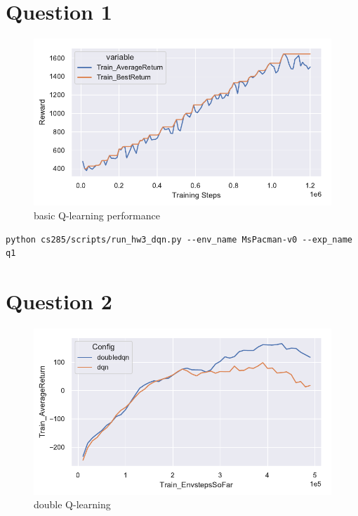 \documentclass[letterpaper, 10pt]{article}
\begin{document}
\section{Question 1}
\begin{figure}[h]
\centering
\includegraphics{figures/q1.pdf}
\caption{basic Q-learning performance}
\end{figure}

\begin{lstlisting}[caption=Exact command line configurations]
python cs285/scripts/run_hw3_dqn.py --env_name MsPacman-v0 --exp_name q1
\end{lstlisting}

\newpage

\section{Question 2}
\begin{figure}[h]
\centering
\includegraphics{figures/q2.pdf}
\caption{double Q-learning}
\end{figure}
\end{document}
